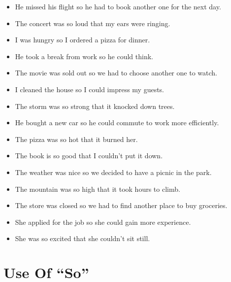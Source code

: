 \documentclass[letterpaper, 17pt]{article}
\begin{document}
\begin{itemize}
	\item He missed his flight so he had to book another one for the next day.	%
	\item The concert was so loud that my ears were ringing.	%
	\item I was hungry so I ordered a pizza for dinner.	%
	\item He took a break from work so he could think.	%
	\item The movie was sold out so we had to choose another one to watch.	%
	\item I cleaned the house so I could impress my guests.	%
	\item The storm was so strong that it knocked down trees.	%
	\item He bought a new car so he could commute to work more efficiently.	%
	\item The pizza was so hot that it burned her.	%
	\item The book is so good that I couldn't put it down.	%
	\item The weather was nice so we decided to have a picnic in the park.	%
	\item The mountain was so high that it took hours to climb.	%
	\item The store was closed so we had to find another place to buy groceries.	%
	\item She applied for the job so she could gain more experience.	%
	\item She was so excited that she couldn't sit still.	%
\end{itemize}

\newpage
\section*{Use Of ``So''}
\end{document}
